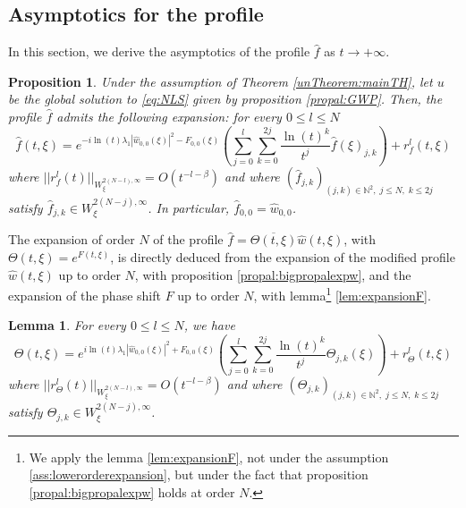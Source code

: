 \documentclass[a4paper, 15pt]{article}
\numberwithin{equation}{section}
\newtheorem{propal}[defi]{Proposition}
\newtheorem{lem}[defi]{Lemma}
\begin{document}
\subsection{Asymptotics for the profile}
\label{subsection:asymptoticprof}
In this section, we derive the asymptotics of the profile $\hat{f}$ as $t\to+\infty$. \\
\begin{propal}
\label{propal:bigpropalexpf}
Under the assumption of Theorem \ref{unTheorem:mainTH}, let $u$ be the global solution to \eqref{eq:NLS} given by proposition \ref{propal:GWP}. Then, the profile $\hat{f}$ admits the  following expansion: for every $0\leq l\leq N$
\begin{equation}
    \hat{f}(t,\xi)= e^{-i\ln(t)\lambda_1|\hat{w}_{0,0}(\xi)|^2-F_{0,0}(\xi)}\left(\sum_{j=0}^l\sum_{k=0}^{2j}\frac{\ln(t)^{k}}{t^{j}}\hat{f}(\xi)_{j,k}\right)+r^l_{f}(t,\xi)
\end{equation}
where $||r^l_f(t)||_{W^{2(N-l),\infty}_\xi}=O(t^{-l-\beta})$ and where $(\hat{f}_{j,k})_{(j,k)\in\mathbb{N}^{2},\;j\leq N,\;k\leq 2j}$ satisfy $\hat{f}_{j,k}\in W^{2(N-j),\infty}_\xi$. In particular, $\hat{f}_{0,0}=\hat{w}_{0,0}$.
\end{propal}
The expansion of order $N$ of the profile $\hat{f}=\overline{\Theta(t,\xi)}\hat{w}(t,\xi)$, with $\Theta(t,\xi)=e^{F(t,\xi)}$, is directly deduced from the expansion of the modified profile $\hat{w}(t,\xi)$ up to order $N$, with proposition \ref{propal:bigpropalexpw}, and the expansion of the phase shift $F$ up to order $N$, with lemma\footnote{We apply the lemma \ref{lem:expansionF}, not under the assumption \ref{ass:lowerorderexpansion}, but under the fact that proposition \ref{propal:bigpropalexpw} holds at order $N$.} \ref{lem:expansionF}.\\
\begin{lem}
\label{lem:expansionTheta}
For every $0\leq l\leq N$, we have
\begin{equation}
\Theta(t,\xi)=e^{i\ln(t)\lambda_1|\hat{w}_{0,0}(\xi)|^2+F_{0,0}(\xi)}(\sum_{j=0}^l\sum_{k=0}^{2j}\frac{\ln(t)^{k}}{t^{j}}\Theta_{j,k}(\xi))+r^l_{\Theta}(t,\xi)
\end{equation}
where $||r^l_\Theta(t)||_{W^{2(N-l),\infty}_\xi}=O(t^{-l-\beta})$ and where $(\Theta_{j,k})_{(j,k)\in\mathbb{N}^{2},\;j\leq N,\;k\leq 2j}$ satisfy $\Theta_{j,k}\in W^{2(N-j),\infty}_\xi$. 
\end{lem}
\end{document}
